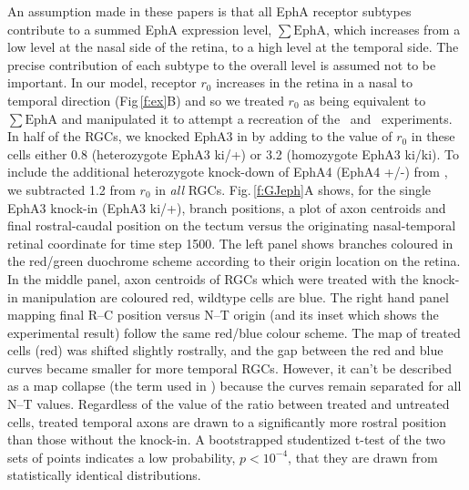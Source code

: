 \documentclass[11pt, a4paper]{article}
\begin{document}
An assumption made in these papers is that all EphA receptor subtypes contribute to a summed EphA expression level, $\sum\mathrm{EphA}$, which increases from a low level at the nasal side of the retina, to a high level at the temporal side. 
The precise contribution of each subtype to the overall level is assumed not to be important. 
In our model, receptor $r_0$ increases in the retina in a nasal to temporal direction (Fig\,\ref{f:ex}B) and so we treated $r_0$ as being equivalent to $\sum\mathrm{EphA}$ and manipulated it to attempt a recreation of the \citet{brown_topographic_2000}~and \citet{reber_relative_2004}~experiments. 
In half of the RGCs, we knocked EphA3 in by adding to the value of $r_0$ in these cells either 0.8 (heterozygote EphA3 ki/+) or 3.2 (homozygote EphA3 ki/ki). 
To include the additional heterozygote knock-down of EphA4 (EphA4 +/-) from \citet{reber_relative_2004}, we subtracted 1.2 from $r_0$ in \emph{all} RGCs.
Fig.\,\ref{f:GJeph}A shows, for the single EphA3 knock-in (EphA3 ki/+), branch positions, a plot of axon centroids and final rostral-caudal position on the tectum versus the originating nasal-temporal retinal coordinate for time step 1500. 
The left panel shows branches coloured in the red/green duochrome scheme according to their origin location on the retina.
In the middle panel, axon centroids of RGCs which were treated with the knock-in manipulation are coloured red, wildtype cells are blue. 
The right hand panel mapping final R--C position versus N--T origin  (and its inset which shows the experimental result) follow the same red/blue colour scheme.
The map of treated cells (red) was shifted slightly rostrally, and the gap between the red and blue curves became smaller for more temporal RGCs. However, it can't be described as a map collapse (the term used in \citet{brown_topographic_2000}) because the curves remain separated for all N--T values. Regardless of the value of the ratio between treated and untreated cells, treated temporal axons are drawn to a significantly more rostral position than those without the knock-in. A bootstrapped studentized t-test of the two sets of points indicates a low probability, $p<10^{-4}$, that they are drawn from statistically identical distributions.
\end{document}
